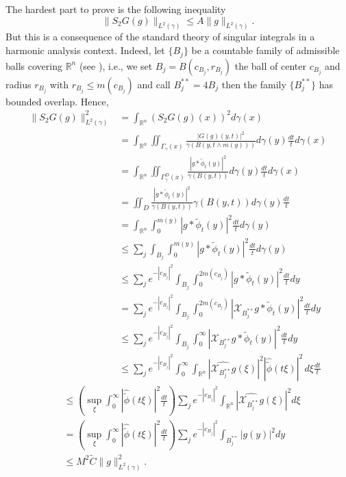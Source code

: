 \documentclass[leqno,11pt]{amsart}
\theoremstyle{plain}
\theoremstyle{remark}
\begin{document}
{{\begin{itemize}
\begin{itemize}
The hardest part to prove is the following inequality
$$\|S_{2}G(g)\|_{L^2(\gamma)}\le A \| g \|_{L^2 (\gamma)}.$$ But this is a consequence of the standard theory of singular integrals in a harmonic analysis context.  Indeed,
let $\{B_j\}$ be a countable family of admissible balls covering $\mathbb{R}^n$ (see \cite{dalsco}), i.e., we set $B_j=B(c_{B_j},r_{B_j})$ the ball of center $c_{B_j}$ and radius $r_{B_j}$ with $r_{B_j}\le m(c_{B_j})$ and call $B^{**}_j=4B_j$ then the family $\{B^{**}_j\}$ has bounded overlap. 
Hence, 
\begin{align*}
\|S_{2}G(g)\|_{L^2(\gamma)}^2&=\int_{\mathbb{R}^n}(S_{2} G(g)(x))^2d\gamma(x)\\ &=\int_{\mathbb{R}^n}\iint_{\Gamma_\gamma(x)}\frac{|G(g) (y,t)|^2}{\gamma(B(y,t\wedge m(y)))}d\gamma(y)\frac{dt}{t}d\gamma(x)\\
&= \int_{\mathbb{R}^n}\iint_{{\Gamma}^D_\gamma(x)}\frac{|g\ast \widetilde{\phi}_t(y)|^2}{\gamma(B(y,t))}d\gamma(y)\frac{dt}{t}d\gamma(x)\\
&=\iint_{D}\frac{|g\ast \widetilde{\phi}_t(y)|^2}{\gamma(B(y,t))}\gamma(B(y,t))d\gamma(y)\frac{dt}{t}\\
&= \int_{\mathbb{R}^n}\int_0^{m(y)}|g\ast \widetilde{\phi}_t(y)|^2\frac{dt}{t}d\gamma(y)\\
&\le \sum_j \int_{B_j}\int_0^{m(y)}|g\ast \widetilde{\phi}_t(y)|^2\frac{dt}{t}d\gamma(y)\\ &\le \sum_j e^{-|c_{B_j}|^2}\int_{B_j}\int_0^{2m(c_{B_j})}|g\ast \widetilde{\phi}_t(y)|^2\frac{dt}{t}dy\\ &= \sum_j e^{-|c_{B_j}|^2}\int_{B_j}\int_0^{2m(c_{B_j})}|\mathcal{X}_{B^{**}_j}g\ast \widetilde{\phi}_t(y)|^2\frac{dt}{t}dy
\\&\le \sum_j e^{-|c_{B_j}|^2}\int_{B_j}\int_0^\infty|\mathcal{X}_{B^{**}_j}g\ast \widetilde{\phi}_t(y)|^2\frac{dt}{t}dy\\ &\le\sum_j e^{-|c_{B_j}|^2}\int_0^\infty \int_{\mathbb{R}^n}|\widehat{\mathcal{X}_{B_j^{**}} g}(\xi)|^2 |\widehat{\widetilde{\phi}}(t\xi)|^2\, d\xi \frac{dt}{t}
\end{align*}
\begin{align*}
&\le \left(\sup_{\xi}\int_0^\infty |\widehat{\widetilde{\phi}}(t\xi)|^2\frac{dt}{t}\right) \sum_j e^{-|c_{B_j}|^2} \int_{\mathbb{R}^n}|\widehat{\mathcal{X}_{B_j^{**}} g}(\xi)|^2 d\xi\\ &=  \left(\sup_{\xi}\int_0^\infty |\widehat{\widetilde{\phi}}(t\xi)|^2\frac{dt}{t}\right) \sum_j e^{-|c_{B_j}|^2} \int_{B_j^{**}}| g(y)|^2 dy\\  & \le  M^2 \widetilde{C} \|g\|_{L^2(\gamma)}^2.
\end{align*}


\end{itemize}
\end{itemize}}}
\end{document}
